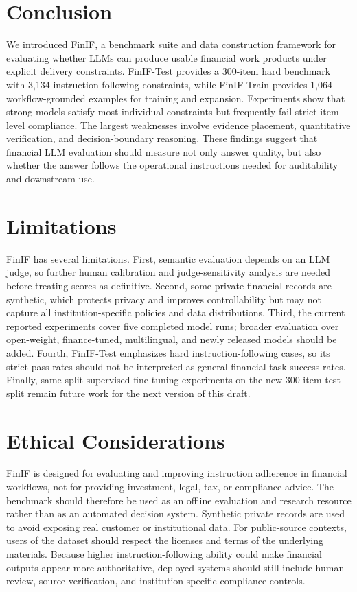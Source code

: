 \section{Conclusion}

We introduced FinIF, a benchmark suite and data construction framework for evaluating whether LLMs can produce usable financial work products under explicit delivery constraints.
FinIF-Test provides a 300-item hard benchmark with 3,134 instruction-following constraints, while FinIF-Train provides 1,064 workflow-grounded examples for training and expansion.
Experiments show that strong models satisfy most individual constraints but frequently fail strict item-level compliance.
The largest weaknesses involve evidence placement, quantitative verification, and decision-boundary reasoning.
These findings suggest that financial LLM evaluation should measure not only answer quality, but also whether the answer follows the operational instructions needed for auditability and downstream use.

\section*{Limitations}

FinIF has several limitations.
First, semantic evaluation depends on an LLM judge, so further human calibration and judge-sensitivity analysis are needed before treating scores as definitive.
Second, some private financial records are synthetic, which protects privacy and improves controllability but may not capture all institution-specific policies and data distributions.
Third, the current reported experiments cover five completed model runs; broader evaluation over open-weight, finance-tuned, multilingual, and newly released models should be added.
Fourth, FinIF-Test emphasizes hard instruction-following cases, so its strict pass rates should not be interpreted as general financial task success rates.
Finally, same-split supervised fine-tuning experiments on the new 300-item test split remain future work for the next version of this draft.

\section*{Ethical Considerations}

FinIF is designed for evaluating and improving instruction adherence in financial workflows, not for providing investment, legal, tax, or compliance advice.
The benchmark should therefore be used as an offline evaluation and research resource rather than as an automated decision system.
Synthetic private records are used to avoid exposing real customer or institutional data.
For public-source contexts, users of the dataset should respect the licenses and terms of the underlying materials.
Because higher instruction-following ability could make financial outputs appear more authoritative, deployed systems should still include human review, source verification, and institution-specific compliance controls.
